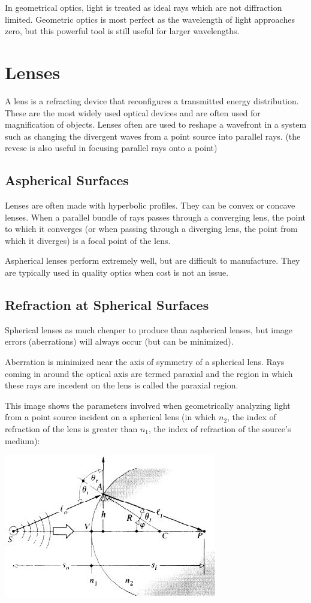 \documentclass[12pt]{report}
\begin{document}
In geometrical optics, light is treated as ideal rays which are not diffraction limited. Geometric optics is most perfect as the wavelength of light approaches zero, but this powerful tool is still useful for larger wavelengths. 

\section{Lenses}
A lens is a refracting device that reconfigures a transmitted energy distribution. These are the most widely used optical devices and are often used for magnification of objects. Lenses often are used to reshape a wavefront in a system such as changing the divergent waves from a point source into parallel rays. (the revese is also useful in focusing parallel rays onto a point)

\subsection{Aspherical Surfaces}
Lenses are often made with hyperbolic profiles. They can be convex or concave lenses. When a parallel bundle of rays passes through a converging lens, the point to which it converges (or when passing through a diverging lens, the point from which it diverges) is a focal point of the lens. 

Aspherical lenses perform extremely well, but are difficult to manufacture. They are typically used in quality optics when cost is not an issue. 

\subsection{Refraction at Spherical Surfaces}
Spherical lenses as much cheaper to produce than aspherical lenses, but image errors (aberrations) will always occur (but can be minimized).

Aberration is minimized near the axis of symmetry of a spherical lens. Rays coming in around the optical axis are termed paraxial and the region in which these rays are incedent on the lens is called the paraxial region. 

This image shows the parameters involved when geometrically analyzing light from a point source incident on a spherical lens (in which $n_2$, the index of refraction of the lens is greater than $n_1$, the index of refraction of the source's medium): 

\includegraphics[scale=.75]{SphericalLens1.jpg}
\end{document}
